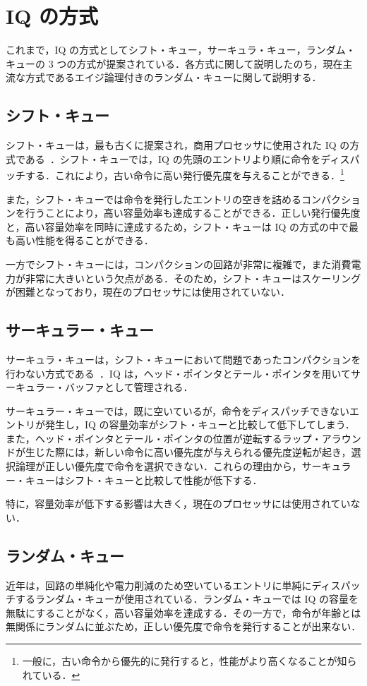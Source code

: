 \section{IQ の方式}
\label{sec:iq_scheme}
これまで，IQ の方式としてシフト・キュー，サーキュラ・キュー，ランダム・キューの 3 つの方式が提案されている．各方式に関して説明したのち，現在主流な方式であるエイジ論理付きのランダム・キューに関して説明する．

\subsection{シフト・キュー}
シフト・キューは，最も古くに提案され，商用プロセッサに使用された IQ の方式である~\cite{Farrell1998}．シフト・キューでは，IQ の先頭のエントリより順に命令をディスパッチする．これにより，古い命令に高い発行優先度を与えることができる．\footnote{一般に，古い命令から優先的に発行すると，性能がより高くなることが知られている．}

また，シフト・キューでは命令を発行したエントリの空きを詰めるコンパクションを行うことにより，高い容量効率も達成することができる．正しい発行優先度と，高い容量効率を同時に達成するため，シフト・キューは IQ の方式の中で最も高い性能を得ることができる．

一方でシフト・キューには，コンパクションの回路が非常に複雑で，また消費電力が非常に大きいという欠点がある．そのため，シフト・キューはスケーリングが困難となっており，現在のプロセッサには使用されていない．

\subsection{サーキュラー・キュー}
サーキュラ・キューは，シフト・キューにおいて問題であったコンパクションを行わない方式である~\cite{Abella:survey2003}．IQ は，ヘッド・ポインタとテール・ポインタを用いてサーキュラー・バッファとして管理される．

サーキュラー・キューでは，既に空いているが，命令をディスパッチできないエントリが発生し，IQ の容量効率がシフト・キューと比較して低下してしまう．また，ヘッド・ポインタとテール・ポインタの位置が逆転するラップ・アラウンドが生じた際には，新しい命令に高い優先度が与えられる優先度逆転が起き，選択論理が正しい優先度で命令を選択できない．これらの理由から，サーキュラー・キューはシフト・キューと比較して性能が低下する．

特に，容量効率が低下する影響は大きく，現在のプロセッサには使用されていない．

\subsection{ランダム・キュー}
近年は，回路の単純化や電力削減のため空いているエントリに単純にディスパッチするランダム・キューが使用されている．ランダム・キューでは IQ の容量を無駄にすることがなく，高い容量効率を達成する．その一方で，命令が年齢とは無関係にランダムに並ぶため，正しい優先度で命令を発行することが出来ない．

